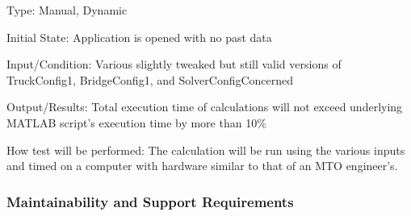 \documentclass[12pt, titlepage]{article}
\begin{document}
\begin{enumerate}
Type: Manual, Dynamic

Initial State: Application is opened with no past data

Input/Condition: Various slightly tweaked but still valid versions of TruckConfig1, BridgeConfig1, and SolverConfigConcerned

Output/Results: Total execution time of calculations will not exceed underlying MATLAB script's execution time by more than 10\%

How test will be performed: The calculation will be run using the various inputs and timed on a computer with hardware similar to that of an MTO engineer's.

\end{enumerate}

\subsubsection{Maintainability and Support Requirements}
\end{document}
